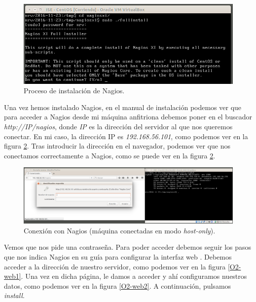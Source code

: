 \documentclass[a4paper,titlepage,12pt]{scrartcl}	%
\numberwithin{figure}{section} %
\numberwithin{table}{section} %
\begin{document}
	\begin{figure}[H]
		\includegraphics[width=\linewidth]{./Imagenes/O2-2.png}
		\vspace{-0.5cm}
		\caption[Proceso de instalación de Nagios.]{Proceso de instalación de Nagios.}
		\label{O2-2}
	\end{figure}
	
	Una vez hemos instalado Nagios, en el manual de instalación \cite{nagios} podemos ver que para acceder a Nagios desde mi máquina anfitriona debemos poner en el buscador \textit{http://IP/nagios}, donde \textit{IP} es la dirección del servidor al que nos queremos conectar. En mi caso, la dirección IP es \textit{192.168.56.101}, como podemos ver en la figura \ref{O2-conexion}. Tras introducir la dirección en el navegador, podemos ver que nos conectamos correctamente a Nagios, como se puede ver en la figura \ref{O2-conexion}.
	
	\begin{figure}[H]
		\includegraphics[width=\linewidth]{./Imagenes/O2-conexion.png}
		\vspace{-0.5cm}
		\caption[Conexión con Nagios (máquina conectadas en modo \textit{host-only}).]{Conexión con Nagios (máquina conectadas en modo \textit{host-only}).}
		\label{O2-conexion}
	\end{figure}
	
	Vemos que nos pide una contraseña. Para poder acceder debemos seguir los pasos que nos indica Nagios en su guía para configurar la interfaz web \cite{nagios2}. Debemos acceder a la dirección de nuestro servidor, como podemos ver en la figura \ref{O2-web1}. Una vez en dicha página, le damos a acceder y ahí configuramos nuestros datos, como podemos ver en la figura \ref{O2-web2}. A continuación, pulsamos \textit{install}.
	
\end{document}

